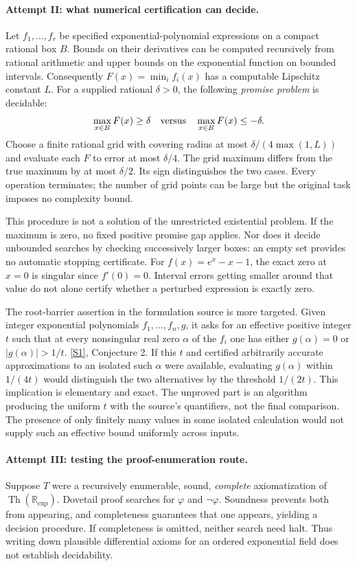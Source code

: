\documentclass[11pt,a4paper]{article}
\newcommand{\R}{\mathbb{R}}
\newcommand{\sref}[2]{\hyperlink{source:#1:#2}{[S#2]}}
\numberwithin{equation}{section}
\begin{document}
\paragraph{Attempt II: what numerical certification can decide.}
Let $f_1,\ldots,f_r$ be specified exponential-polynomial expressions on
a compact rational box $B$.  Bounds on their derivatives can be
computed recursively from rational arithmetic and upper bounds on the
exponential function on bounded intervals.  Consequently
$F(x)=\min_i f_i(x)$ has a computable Lipschitz constant $L$.
For a supplied rational $\delta>0$, the following \emph{promise problem}
is decidable:
\[
 \max_{x\in B}F(x)\geq\delta
 \quad\hbox{versus}\quad
 \max_{x\in B}F(x)\leq-\delta.
\]
Choose a finite rational grid with covering radius at most
$\delta/(4\max(1,L))$ and evaluate each $F$ to error at most
$\delta/4$.  The grid maximum differs from the true maximum by at
most $\delta/2$.  Its sign distinguishes the two cases.  Every
operation terminates; the number of grid points can be large but the
original task imposes no complexity bound.

This procedure is not a solution of the unrestricted existential
problem.  If the maximum is zero, no fixed positive promise gap applies.
Nor does it decide unbounded searches by checking successively larger
boxes: an empty set provides no automatic stopping certificate.
For $f(x)=e^x-x-1$, the exact zero at $x=0$ is singular since $f'(0)=0$.
Interval errors getting smaller around that value do not alone certify
whether a perturbed expression is exactly zero.

The root-barrier assertion in the formulation source is more targeted.
Given integer exponential polynomials $f_1,\ldots,f_n,g$, it asks for
an effective positive integer $t$ such that at every nonsingular real
zero $\alpha$ of the $f_i$ one has either $g(\alpha)=0$ or
$|g(\alpha)|>1/t$. \sref{124}{1}, Conjecture 2.
If this $t$ and certified arbitrarily accurate approximations to an
isolated such $\alpha$ were available, evaluating $g(\alpha)$ within
$1/(4t)$ would distinguish the two alternatives by the threshold
$1/(2t)$.  This implication is elementary and exact.  The unproved
part is an algorithm producing the uniform $t$ with the source's
quantifiers, not the final comparison.  The presence of only finitely
many values in some isolated calculation would not supply such an
effective bound uniformly across inputs.

\paragraph{Attempt III: testing the proof-enumeration route.}
Suppose $T$ were a recursively enumerable, sound, \emph{complete}
axiomatization of $\operatorname{Th}(\R_{\exp})$.  Dovetail proof
searches for $\varphi$ and $\neg\varphi$.  Soundness prevents both from
appearing, and completeness guarantees that one appears, yielding a
decision procedure.  If completeness is omitted, neither search need
halt.  Thus writing down plausible differential axioms for an ordered
exponential field does not establish decidability.
\end{document}
